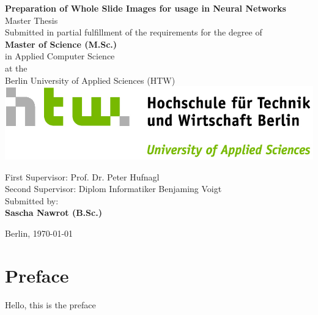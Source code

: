 \documentclass{report}
\begin{document}
\begin{titlepage}
	\centering
	{\huge\textbf{Preparation of Whole Slide Images for usage in Neural
	Networks\\}}
	\vspace{1cm}
	{\huge Master Thesis\\}
	\vspace{2cm}
	{\large Submitted in partial fulfillment of the requirements for the degree
	of\\}
	\vspace{0.5cm}
	{\large \textbf{Master of Science (M.Sc.)}\\ 
	in Applied Computer Science\\}
	\vspace{0.5cm}
	{\large at the\\}
	\vspace{0.5cm}
	{\large Berlin University of Applied Sciences (HTW)\\}
	\vspace{0.5cm}
	\includegraphics[scale=1]{img/HTW_Logo_quer_rgb.jpg}
	\\
	\vspace{1cm}
	\raggedright
	{\large First Supervisor: Prof. Dr. Peter Hufnagl\\}
	\vspace{0.25cm}
	{\large Second Supervisor: Diplom Informatiker Benjaming Voigt\\}
	\centering
	\vspace{1.5cm}
	{\large Submitted by: \\}
	\vspace{0.25cm}
	{\large \textbf{Sascha Nawrot (B.Sc.)}}
	\vfill
		{\large Berlin, \today{}\par}
\end{titlepage}

\newpage
\chapter*{Preface}
Hello, this is the preface

\newpage
\begin{abstract}
This is the abstract.
\end{abstract}
\newpage

\tableofcontents
\newpage







\begin{appendices}
	
\end{appendices}



\printnomenclature
\listoffigures
\listoftables
\end{document}

